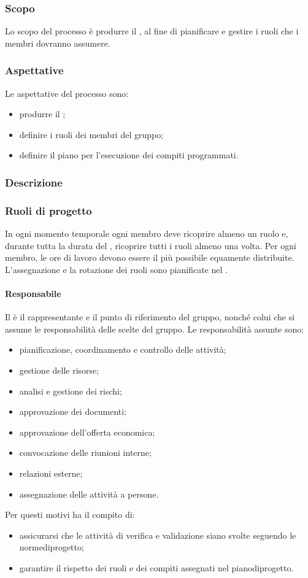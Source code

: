 \subsubsection{Scopo}
Lo scopo del processo è produrre il \PPdoc , al fine di pianificare e gestire i ruoli che i membri dovranno assumere.
\subsubsection{Aspettative}
Le aspettative del processo sono:
 \begin{itemize}
  \item produrre il \PPdoc ;
  \item definire i ruoli dei membri del gruppo;
  \item definire il piano per l'esecuzione dei compiti programmati.
 \end{itemize}
\subsubsection{Descrizione}
 
\subsubsection{Ruoli di progetto}
 In ogni momento temporale ogni membro deve ricoprire almeno un ruolo e, durante tutta la durata del , ricoprire tutti i ruoli almeno una volta. Per ogni membro, le ore di lavoro devono essere il più possibile equamente distribuite. L'assegnazione e la rotazione dei ruoli sono pianificate nel \PPdocRR.
 \paragraph{Responsabile}
 Il \RESP{} è il rappresentante e il punto di riferimento del gruppo, nonché colui che si assume le responsabilità delle scelte del gruppo.
 Le responsabilità assunte sono:
 \begin{itemize}
  \item pianificazione, coordinamento e controllo delle attività;
  \item gestione delle risorse;
  \item analisi e gestione dei rischi;
  \item approvazione dei documenti;
  \item approvazione dell'offerta economica;
  \item convocazione delle riunioni interne;
  \item relazioni esterne;
  \item assegnazione delle attività a persone.
\end{itemize}
Per questi motivi ha il compito di:
\begin{itemize}
	\item assicurarsi che le attività di verifica e validazione siano svolte seguendo le normediprogetto;
	\item garantire il rispetto dei ruoli e dei compiti assegnati nel pianodiprogetto.
\end{itemize}

